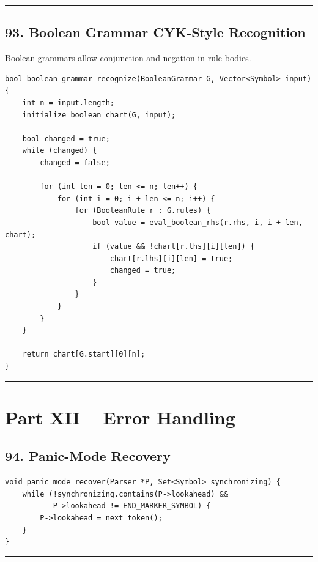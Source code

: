 \documentclass[10pt,letterpaper]{article}
\begin{document}
\medskip\hrule\medskip

\subsection*{93. Boolean Grammar CYK-Style Recognition}

Boolean grammars allow conjunction and negation in rule bodies.

\begin{verbatim}
bool boolean_grammar_recognize(BooleanGrammar G, Vector<Symbol> input) {
    int n = input.length;
    initialize_boolean_chart(G, input);

    bool changed = true;
    while (changed) {
        changed = false;

        for (int len = 0; len <= n; len++) {
            for (int i = 0; i + len <= n; i++) {
                for (BooleanRule r : G.rules) {
                    bool value = eval_boolean_rhs(r.rhs, i, i + len, chart);
                    if (value && !chart[r.lhs][i][len]) {
                        chart[r.lhs][i][len] = true;
                        changed = true;
                    }
                }
            }
        }
    }

    return chart[G.start][0][n];
}
\end{verbatim}

\medskip\hrule\medskip

\clearpage
\section*{Part XII -- Error Handling}

\subsection*{94. Panic-Mode Recovery}

\begin{verbatim}
void panic_mode_recover(Parser *P, Set<Symbol> synchronizing) {
    while (!synchronizing.contains(P->lookahead) &&
           P->lookahead != END_MARKER_SYMBOL) {
        P->lookahead = next_token();
    }
}
\end{verbatim}

\medskip\hrule\medskip
\end{document}
